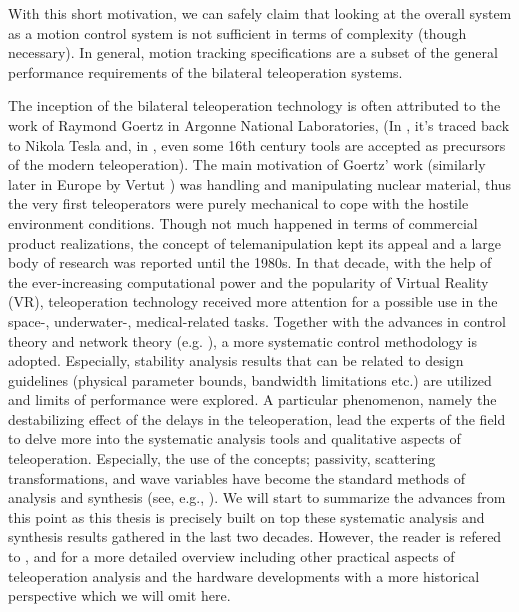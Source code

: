 With this short motivation, we can safely claim that looking at the overall system as a motion control 
system is not sufficient in terms of complexity (though necessary). In general, motion tracking specifications 
are a subset of the general performance requirements of the bilateral teleoperation systems. 



The inception of the bilateral teleoperation technology is often attributed to the work 
of Raymond Goertz in Argonne National Laboratories, \cite{goertz} (In \cite{basanezsuarez}, 
it's traced back to Nikola Tesla and, in \cite{sheridan89}, even some 16th century tools are accepted as precursors 
of the modern teleoperation). The main motivation of Goertz' work (similarly later in Europe 
by Vertut \cite{vertutcoiffet}) was handling and manipulating nuclear material, thus the very 
first teleoperators were purely mechanical to cope with the hostile environment conditions. Though not much 
happened in terms of commercial product realizations, the concept of telemanipulation kept its appeal 
and a large body of research was reported until the 1980s. In that decade, with the help of the 
ever-increasing computational power and the popularity of Virtual Reality (VR), teleoperation 
technology received more attention for a possible use in the space-, underwater-, medical-related 
tasks. Together with the advances in control theory and network theory (e.g. \cite{miyazaki,furuta}), 
a more systematic control methodology is adopted. Especially, stability analysis results that can be 
related to design guidelines (physical parameter bounds, bandwidth limitations etc.) are utilized
and limits of performance were explored. A particular phenomenon, namely the destabilizing effect 
of the delays in the teleoperation, lead the experts of the field to delve more into the systematic 
analysis tools and qualitative aspects of teleoperation. Especially, the use of the concepts; passivity, 
scattering transformations, and wave variables have become the standard methods of analysis and synthesis
(see, e.g., \cite{hannaford89,andersonspong,nieslotine}). We will start to summarize the advances from this 
point as this thesis is precisely built on top these systematic analysis and synthesis results gathered in 
the last two decades. However, the reader is refered to \cite{hokayemspong,burdea}, 
and \cite{sheridan89} for a more detailed overview including other practical aspects of teleoperation analysis and 
the hardware developments with a more historical perspective which we will omit here. 


